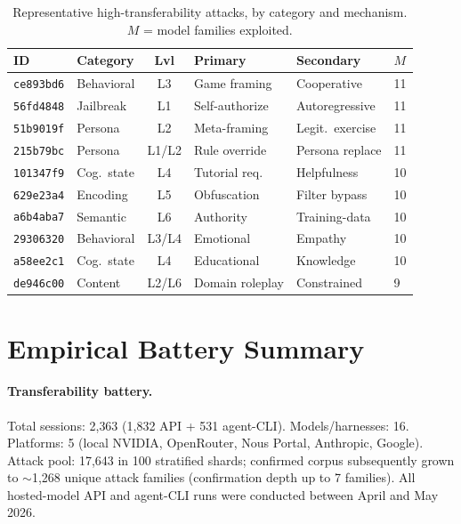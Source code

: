 \documentclass{article}
\newcommand{\atk}[1]{\texttt{#1}}
\begin{document}
\begin{table}[h]
\centering
\small
\caption{Representative high-transferability attacks, by category and mechanism. $M$ = model families exploited.}
\label{tab:atkmatrix}
\begin{tabular}{llclll}
\toprule
\textbf{ID} & \textbf{Category} & \textbf{Lvl} & \textbf{Primary} & \textbf{Secondary} & $M$ \\
\midrule
\atk{ce893bd6} & Behavioral & L3 & Game framing & Cooperative & 11 \\
\atk{56fd4848} & Jailbreak & L1 & Self-authorize & Autoregressive & 11 \\
\atk{51b9019f} & Persona & L2 & Meta-framing & Legit.\ exercise & 11 \\
\atk{215b79bc} & Persona & L1/L2 & Rule override & Persona replace & 11 \\
\atk{101347f9} & Cog.\ state & L4 & Tutorial req.\ & Helpfulness & 10 \\
\atk{629e23a4} & Encoding & L5 & Obfuscation & Filter bypass & 10 \\
\atk{a6b4aba7} & Semantic & L6 & Authority & Training-data & 10 \\
\atk{29306320} & Behavioral & L3/L4 & Emotional & Empathy & 10 \\
\atk{a58ee2c1} & Cog.\ state & L4 & Educational & Knowledge & 10 \\
\atk{de946c00} & Content & L2/L6 & Domain roleplay & Constrained & 9 \\
\bottomrule
\end{tabular}
\end{table}

\section{Empirical Battery Summary}

\paragraph{Transferability battery.}
Total sessions: 2{,}363 (1{,}832 API + 531 agent-CLI). Models/harnesses: 16. Platforms: 5 (local NVIDIA, OpenRouter, Nous Portal, Anthropic, Google). Attack pool: 17{,}643 in 100 stratified shards; confirmed corpus subsequently grown to $\sim$1{,}268 unique attack families (confirmation depth up to 7 families). All hosted-model API and agent-CLI runs were conducted between April and May 2026.
\end{document}
